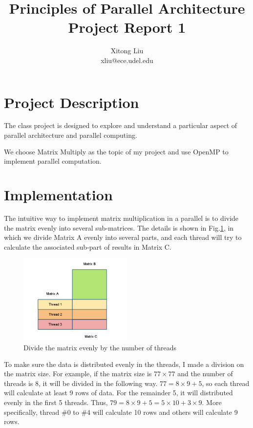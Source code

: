 \documentclass[12pt]{article}
\title{Principles of Parallel Architecture\\
Project Report 1}
\author{Xitong Liu \\
xliu@ece.udel.edu}
\begin{document}
\maketitle

\section{Project Description}
The class project is designed to explore and understand a 
particular aspect of parallel architecture and parallel 
computing.

We choose Matrix Multiply as the topic of my project and use 
OpenMP to implement parallel computation.

\section{Implementation}
The intuitive way to implement matrix multiplication in a 
parallel is to divide the matrix evenly into several
sub-matrices. The details is shown in 
Fig.\ref{fig:matrix-divide}, in which we divide Matrix A
evenly into several parts, and each thread will try to 
calculate the associated sub-part of results in Matrix C.

\begin{figure}[h!]
	\begin{center}
		\includegraphics[width=0.5\textwidth]{matrix-divide.png}
		\caption{\label{fig:matrix-divide}Divide the matrix 
			evenly by the number of threads}
	\end{center}
\end{figure}

To make sure the data is distributed evenly in the threads, 
I made a division on the matrix size. For example, if the 
matrix size is $77\times 77$ and the number of threads is 
8, it will be divided in the following way. $77 = 8\times 9+5$, 
so each thread will calculate at least 9 rows of data. 
For the remainder 5, it will distributed evenly in the first 
5 threads. Thus, $79=8\times 9+5 = 5\times 10+3\times 9$. 
More specifically, thread \#0 to \#4 will calculate 10 rows 
and others will calculate 9 rows.
\end{document}
